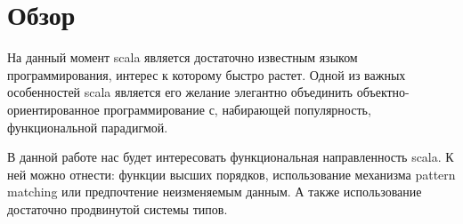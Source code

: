 \section{Обзор}
\label{overview}

На данный момент scala является достаточно известным языком программирования,
интерес к которому быстро растет.
Одной из важных особенностей scala является его желание элегантно объединить
объектно-ориентированное программирование с, набирающей популярность,
функциональной парадигмой.

В данной работе нас будет интересовать функциональная направленность scala.
К ней можно отнести: функции высших порядков, использование механизма
pattern matching или предпочтение неизменяемым данным.
А также использование достаточно продвинутой системы типов.

